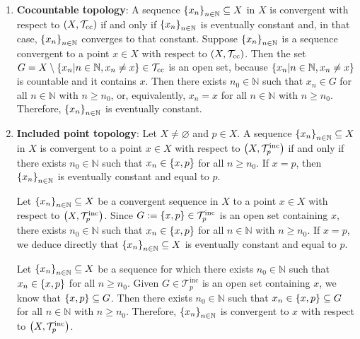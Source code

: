 \begin{example}
\begin{enumerate}
    We have also proved that if a sequence $\set{x_n}_{n\in\mathbb{N}}\subseteq X$ in $X$ does not contain any point in $X$ infinite times, then it is convergent to any point in $X$ with respect to $\pr{X,\mathcal{T}_{\text{cof}}}$.
    \item \textbf{Cocountable topology}: A sequence $\set{x_n}_{n\in\mathbb{N}}\subseteq X$ in $X$ is convergent with respect to $\left(X,\mathcal{T}_{\text{cc}}\right)$ if and only if $\left\{x_n\right\}_{n\in\mathbb{N}}$ is eventually constant and, in that case, $\left\{x_n\right\}_{n\in\mathbb{N}}$ converges to that constant. Suppose $\left\{x_n\right\}_{n\in\mathbb{N}}$ is a sequence convergent to a point $x\in X$ with respect to $\left(X,\mathcal{T}_{\text{cc}}\right)$. Then the set $G=X\setminus\left\{x_n\middle|n\in\mathbb{N},x_n\neq x\right\}\in\mathcal{T}_{\text{cc}}$ is an open set, because $\left\{x_n\middle|n\in\mathbb{N},x_n\neq x\right\}$ is countable and it contains $x$. Then there exists $n_0\in\mathbb{N}$ such that $x_n\in G$ for all $n\in\mathbb{N}$ with $n\geq n_0$, or, equivalently, $x_n=x$ for all $n\in\mathbb{N}$ with $n\geq n_0$. Therefore, $\left\{x_n\right\}_{n\in\mathbb{N}}$ is eventually constant.
    \item \textbf{Included point topology}: Let $X\neq\varnothing$ and $p\in X$. A sequence $\set{x_n}_{n\in\mathbb{N}}\subseteq X$ in $X$ is convergent to a point $x\in X$ with respect to $\left(X,\mathcal{T}_p^{\text{inc}}\right)$ if and only if there exists $n_0\in\mathbb{N}$ such that $x_n\in\left\{x,p\right\}$ for all $n\geq n_0$. If $x=p$, then $\left\{x_n\right\}_{n\in\mathbb{N}}$ is eventually constant and equal to $p$.
    
    Let $\set{x_n}_{n\in\mathbb{N}}\subseteq X$ be a convergent sequence in $X$ to a point $x\in X$ with respect to $\left(X,\mathcal{T}_p^{\text{inc}}\right)$. Since $G:=\left\{x,p\right\}\in\mathcal{T}_p^{\text{inc}}$ is an open set containing $x$, there exists $n_0\in\mathbb{N}$ such that $x_n\in\left\{x,p\right\}$ for all $n\in\mathbb{N}$ with $n\geq n_0$. If $x=p$, we deduce directly that $\set{x_n}_{n\in\mathbb{N}}\subseteq X$ is eventually constant and equal to $p$.

    Let $\set{x_n}_{n\in\mathbb{N}}\subseteq X$ be a sequence for which there exists $n_0\in\mathbb{N}$ such that $x_n\in\left\{x,p\right\}$ for all $n\geq n_0$. Given $G\in\mathcal{T}_p^{\text{inc}}$ is an open set containing $x$, we know that $\left\{x,p\right\}\subseteq G$. Then there exists $n_0\in\mathbb{N}$ such that $x_n\in\left\{x,p\right\}\subseteq G$ for all $n\in\mathbb{N}$ with $n\geq n_0$. Therefore, $\left\{x_n\right\}_{n\in\mathbb{N}}$ is convergent to $x$ with respect to $\left(X,\mathcal{T}_p^{\text{inc}}\right)$. 


\end{enumerate}
\end{example}
